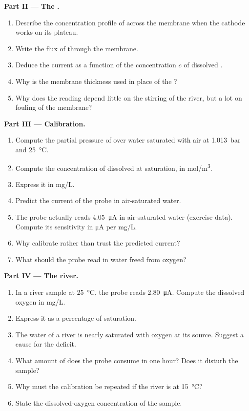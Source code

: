 \begin{problem}
\medskip
\noindent\textbf{Part II --- The .}
\begin{enumerate}[resume]
  \item Describe the concentration profile of  across the membrane when the
        cathode works on its plateau.
  \item Write the flux of  through the membrane.
  \item Deduce the current as a function of the concentration $c$ of dissolved
        .
  \item Why is the membrane thickness used in place of the ?
  \item Why does the reading depend little on the stirring of the river, but a
        lot on fouling of the membrane?
\end{enumerate}

\medskip
\noindent\textbf{Part III --- Calibration.}
\begin{enumerate}[resume]
  \item Compute the partial pressure of  over water saturated with air at
        \qty{1.013}{bar} and \qty{25}{\degreeCelsius}.
  \item Compute the concentration of dissolved  at saturation, in
        \unit{mol/m^3}.
  \item Express it in \unit{mg/L}.
  \item Predict the current of the probe in air-saturated water.
  \item The probe actually reads \qty{4.05}{\micro A} in air-saturated water
        (exercise data). Compute its sensitivity in \unit{\micro A} per
        \unit{mg/L}.
  \item Why calibrate rather than trust the predicted current?
  \item What should the probe read in water freed from oxygen?
\end{enumerate}

\medskip
\noindent\textbf{Part IV --- The river.}
\begin{enumerate}[resume]
  \item In a river sample at \qty{25}{\degreeCelsius}, the probe reads
        \qty{2.80}{\micro A}. Compute the dissolved oxygen in \unit{mg/L}.
  \item Express it as a percentage of saturation.
  \item The water of a river is nearly saturated with oxygen at its source.
        Suggest a cause for the deficit.
  \item What amount of  does the probe consume in one hour? Does it
        disturb the sample?
  \item Why must the calibration be repeated if the river is at
        \qty{15}{\degreeCelsius}?
  \item State the dissolved-oxygen concentration of the sample.
\end{enumerate}
\end{problem}

